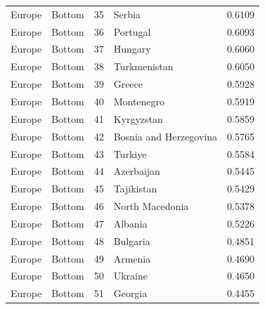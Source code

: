 \begin{table}
\begin{tabular}{llrlr}
Europe & Bottom & 35 & Serbia & 0.6109 \\
Europe & Bottom & 36 & Portugal & 0.6093 \\
Europe & Bottom & 37 & Hungary & 0.6060 \\
Europe & Bottom & 38 & Turkmenistan & 0.6050 \\
Europe & Bottom & 39 & Greece & 0.5928 \\
Europe & Bottom & 40 & Montenegro & 0.5919 \\
Europe & Bottom & 41 & Kyrgyzstan & 0.5859 \\
Europe & Bottom & 42 & Bosnia and Herzegovina & 0.5765 \\
Europe & Bottom & 43 & Turkiye & 0.5584 \\
Europe & Bottom & 44 & Azerbaijan & 0.5445 \\
Europe & Bottom & 45 & Tajikistan & 0.5429 \\
Europe & Bottom & 46 & North Macedonia & 0.5378 \\
Europe & Bottom & 47 & Albania & 0.5226 \\
Europe & Bottom & 48 & Bulgaria & 0.4851 \\
Europe & Bottom & 49 & Armenia & 0.4690 \\
Europe & Bottom & 50 & Ukraine & 0.4650 \\
Europe & Bottom & 51 & Georgia & 0.4455 \\
\bottomrule
\end{tabular}
\end{table}
